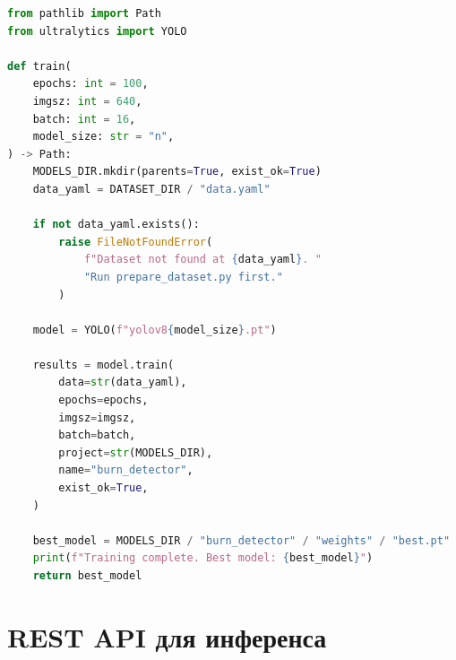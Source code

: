 \begin{lstlisting}[language=Python, caption=Скрипт обучения модели (train.py), label=lst:train_full]
from pathlib import Path
from ultralytics import YOLO

def train(
    epochs: int = 100,
    imgsz: int = 640,
    batch: int = 16,
    model_size: str = "n",
) -> Path:
    MODELS_DIR.mkdir(parents=True, exist_ok=True)
    data_yaml = DATASET_DIR / "data.yaml"

    if not data_yaml.exists():
        raise FileNotFoundError(
            f"Dataset not found at {data_yaml}. "
            "Run prepare_dataset.py first."
        )

    model = YOLO(f"yolov8{model_size}.pt")

    results = model.train(
        data=str(data_yaml),
        epochs=epochs,
        imgsz=imgsz,
        batch=batch,
        project=str(MODELS_DIR),
        name="burn_detector",
        exist_ok=True,
    )

    best_model = MODELS_DIR / "burn_detector" / "weights" / "best.pt"
    print(f"Training complete. Best model: {best_model}")
    return best_model
\end{lstlisting}

\section{REST API для инференса}

